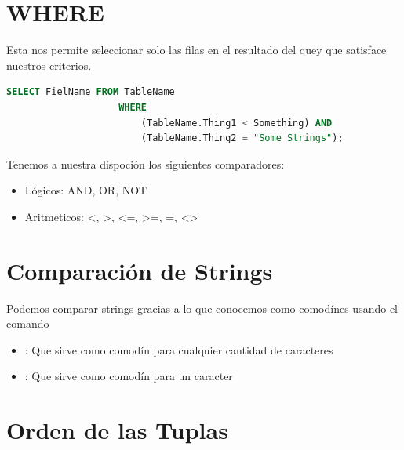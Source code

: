 \documentclass[12pt, fleqn]{report}                             %
\newcommand \Quote {\qq}                                        %
\begin{document}
        \clearpage
        \section{WHERE}

            Esta nos permite seleccionar solo las filas en el resultado del quey
            que satisface nuestros criterios.

            \begin{lstlisting}[language=SQL, gobble=16]
                SELECT FielName FROM TableName
                    WHERE
                        (TableName.Thing1 < Something) AND
                        (TableName.Thing2 = "Some Strings");
            \end{lstlisting}

            Tenemos a nuestra dispoción los siguientes comparadores:
            \begin{itemize}
                \item Lógicos: AND, OR, NOT
                \item Aritmeticos: <, >, <=, >=, =, <>
            \end{itemize}



        \section{Comparación de Strings}
            
            Podemos comparar strings gracias a lo que conocemos como comodínes usando
            el comando \Quote{LIKE}
            \begin{itemize}
                \item \Quote{\%}: Que sirve como comodín para cualquier cantidad de caracteres 
                \item \Quote{\_}: Que sirve como comodín para un caracter 
            \end{itemize}


        \section{Orden de las Tuplas}
\end{document}
